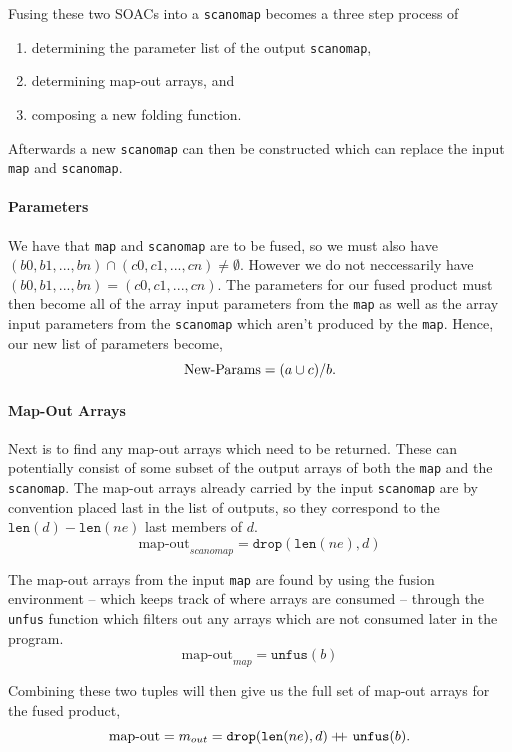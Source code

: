 \documentclass[11pt]{article}
\newcommand\doubleplus{+\kern-1.3ex+\kern0.8ex}
\begin{document}
Fusing these two SOACs into a \texttt{scanomap} becomes a three step process of
\begin{enumerate}
\item determining the parameter list of the output \texttt{scanomap},
\item determining map-out arrays, and
\item composing a new folding function.
\end{enumerate}
Afterwards a new \texttt{scanomap} can then be constructed which can replace the input \texttt{map} and \texttt{scanomap}.
\paragraph{Parameters}

We have that \texttt{map} and \texttt{scanomap} are to be fused, so we must also have $(b0, b1, ...,bn) \cap (c0, c1, ..., cn) \neq \emptyset$. However
 we do not neccessarily have $(b0, b1, ...,bn) = (c0, c1, ..., cn)$. The parameters for our fused product must then become all of the array input parameters from the \texttt{map} as well as
 the array input parameters from the \texttt{scanomap} which aren't produced by the \texttt{map}. Hence, our new list of parameters become,
$$\text{New-Params} = (a \cup c) / b\mathnormal{.}$$


\paragraph{Map-Out Arrays}
Next is to find any map-out arrays which need to be returned. These can potentially consist of some subset of the output arrays of both the \texttt{map} and the \texttt{scanomap}. The map-out arrays
 already carried by the input \texttt{scanomap} are by convention placed last in the list of outputs, so they correspond to the $\mathtt{len}(d) - \mathtt{len}(ne)$ last members of $d$.
$$\text{map-out}_{scanomap} = \mathtt{drop}(\mathtt{len}(ne),d)$$

The map-out arrays from the input \texttt{map} are found by using the fusion environment
 -- which keeps track of where arrays are consumed -- through the \texttt{unfus} function which
 filters out any arrays which are not consumed later in the program.
$$\text{map-out}_{map} = \mathtt{unfus} (b)$$

Combining these two tuples will then give us the full set of map-out arrays for the fused product,
$$\text{map-out} = m_{out} = \mathtt{drop}(\mathtt{len}(ne),d) \doubleplus \mathtt{unfus} (b)\mathnormal{.}$$
\end{document}
